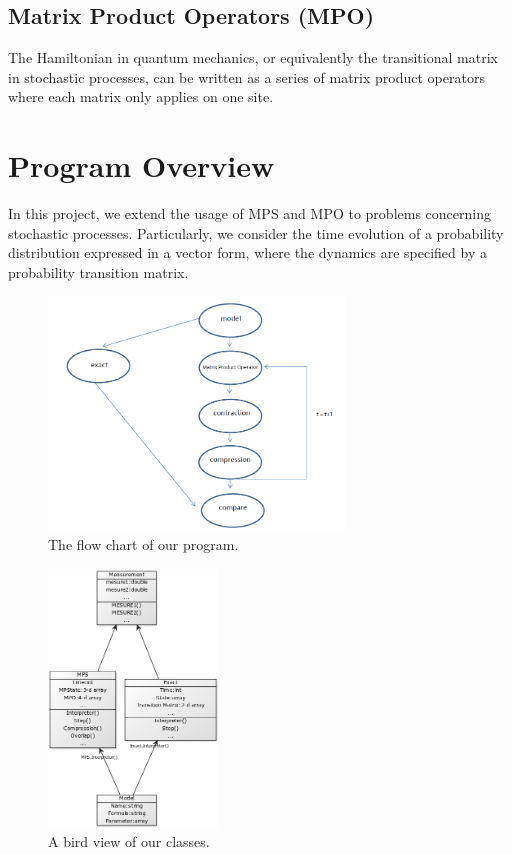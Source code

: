 \documentclass[english]{article}
\begin{document}
\subsection{Matrix Product Operators (MPO)}
The Hamiltonian in quantum mechanics, or equivalently the transitional matrix in stochastic processes, can be written as a series of matrix product operators where each matrix only applies on one site.

\section{Program Overview}
In this project, we extend the usage of MPS and MPO to problems concerning stochastic processes. Particularly, we  consider the time evolution of a probability distribution expressed in a vector form, where the dynamics are specified by a probability transition matrix.

\begin{figure}[htbp]
\begin{center}
\includegraphics[width=0.7\textwidth]{flow_chart.PNG}
\caption{The flow chart of our program.}
\label{fig:flow_chart}
\end{center}
\end{figure}

\begin{figure}[htbp]
\begin{center}
\includegraphics[width=0.4\textwidth]{class_diagram.png}
\caption{A bird view of our classes.}
\label{fig:class_diagram}
\end{center}
\end{figure}
\end{document}
